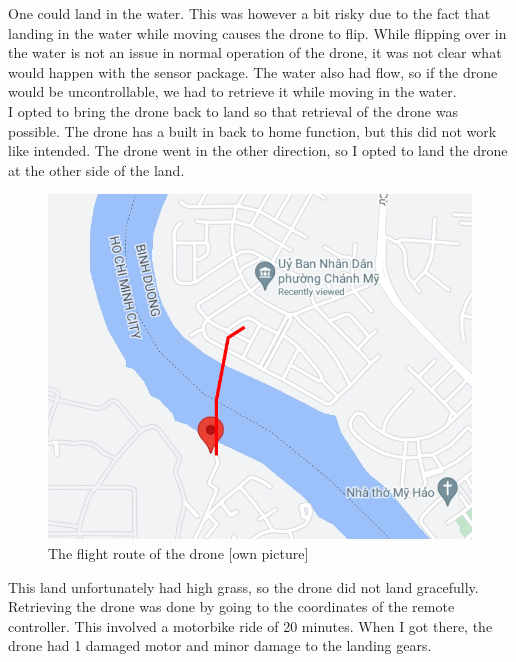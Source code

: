 One could land in the water. This was however a bit risky due to the fact that landing in the water while moving causes the drone to flip. While flipping over in the water is not an issue in normal operation of the drone, it was not clear what would happen with the sensor package. The water also had flow, so if the drone would be uncontrollable, we had to retrieve it while moving in the water.\\

I opted to bring the drone back to land so that retrieval of the drone was possible. The drone has a built in back to home function, but this did not work like intended. The drone went in the other direction, so I opted to land the drone at the other side of the land.
\newpage

\begin{figure}[h]
\centering
\includegraphics[scale=1.2]{080_testing/flights/31_flight.jpg}
\caption{The flight route of the drone [own picture]}
\end{figure}

This land unfortunately had high grass, so the drone did not land gracefully. Retrieving the drone was done by going to the coordinates of the remote controller. This involved a motorbike ride of 20 minutes. When I got there, the drone had 1 damaged motor and minor damage to the landing gears.

